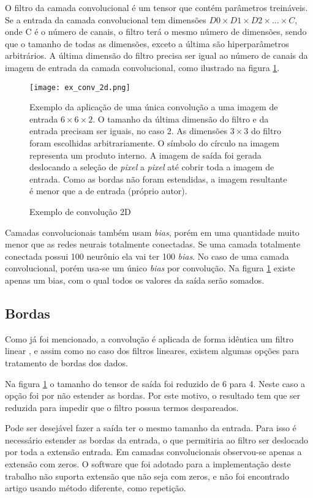 O filtro da camada convolucional é um tensor que contém parâmetros treináveis.
Se a entrada da camada convolucional tem dimensões
$D0 \times D1 \times D2 \times ... \times C$, onde C é o número de canais,
o filtro terá o mesmo número de dimensões, sendo que o tamanho de todas
as dimensões, exceto a última são
hiperparâmetros arbitrários. A última dimensão do filtro precisa ser igual ao
número de canais da imagem de entrada da camada convolucional, como ilustrado na
figura \ref{fig:ex_conv_2d}.


\begin{figure}[!htb]
	\centering
	\texttt{[image: ex\_conv\_2d.png]}
	\caption{Exemplo de convolução 2D}
	\label{fig:ex_conv_2d}
	Exemplo da aplicação de uma única convolução a uma imagem de
	entrada $6 \times 6 \times 2$. O tamanho da última dimensão do filtro e
	da entrada precisam ser iguais, no caso 2. As dimensões $3 \times 3$ do
	filtro foram escolhidas arbitrariamente. O símbolo do círculo na imagem
	representa um produto interno. A imagem de saída foi gerada deslocando
	a seleção de \emph{pixel} a \emph{pixel} até cobrir toda a
	imagem de entrada. Como as bordas não foram estendidas, a imagem
	resultante é menor que a de entrada (próprio autor).
\end{figure}

Camadas convolucionais também usam \emph{bias}, porém em uma quantidade muito
menor que as redes neurais totalmente conectadas. Se uma camada totalmente
conectada possui 100 neurônio ela vai ter 100 \emph{bias}. No caso de uma camada
convolucional, porém usa-se um único \emph{bias} por convolução. Na figura
\ref{fig:ex_conv_2d} existe apenas um bias, com o qual todos os valores da
saída serão somados.

\subsection{Bordas} \label{ses:bordas}
Como já foi mencionado, a convolução é aplicada de forma idêntica
um filtro linear \cite{gonzalezwoods200708}, e assim como no caso dos
filtros lineares, existem algumas opções para tratamento de bordas dos dados.

Na figura \ref{fig:ex_conv_2d} o tamanho do tensor de saída foi reduzido
de 6 para 4. Neste caso a opção foi por não estender as bordas. Por
este motivo, o resultado tem que ser reduzida para impedir que o filtro
possua termos despareados.

Pode ser
desejável fazer a saída ter o mesmo tamanho da entrada. Para isso é necessário
estender as bordas da entrada, o que permitiria ao filtro ser deslocado por
toda a extensão entrada. Em camadas convolucionais observou-se apenas a
extensão com zeros. O software que foi adotado para a implementação deste
trabalho não suporta extensão que não seja com zeros, e não foi encontrado
artigo usando método diferente, como repetição.

